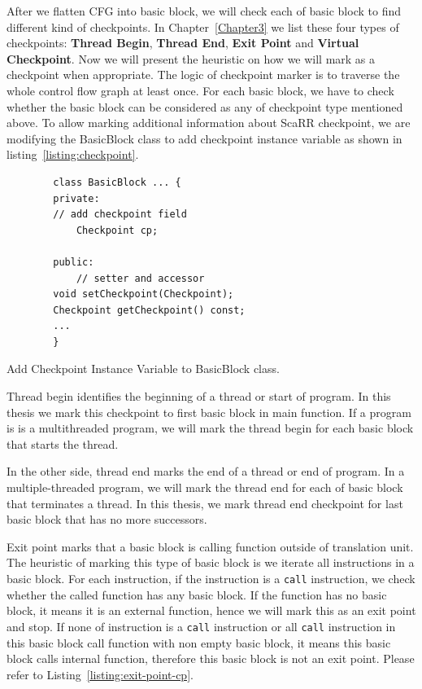 After we flatten CFG into basic block, we will check each of basic block to find
different kind of checkpoints. In Chapter~\ref{Chapter3} we list these four
types of checkpoints: \textbf{Thread Begin}, \textbf{Thread End}, \textbf{Exit
Point} and \textbf{Virtual Checkpoint}. Now we will present the heuristic on how
we will mark as a checkpoint when appropriate.  The logic of checkpoint marker
is to traverse the whole control flow graph at least once. For each basic block,
we have to check whether the basic block can be considered as any of checkpoint
type mentioned above. To allow marking additional information about ScaRR
checkpoint, we are modifying the BasicBlock class to add checkpoint instance
variable as shown in listing~\ref{listing:checkpoint}.

\begin{listing}[htbp]
    \begin{verbatim}
        class BasicBlock ... {
        private:
        // add checkpoint field
            Checkpoint cp;

        public:
            // setter and accessor
        void setCheckpoint(Checkpoint);
        Checkpoint getCheckpoint() const;
        ...
        }
    \end{verbatim}
    \caption{Add Checkpoint Instance Variable to BasicBlock class.}    
    \label{listing:checkpoint}
\end{listing}

Thread begin identifies the beginning of a thread or start of program. In this
thesis we mark this checkpoint to first basic block in main function. If a
program is is a multithreaded program, we will mark the thread begin for each
basic block that starts the thread.

In the other side, thread end marks the end of a thread or end of program. In a
multiple-threaded program, we will mark the thread end for each of basic block
that terminates a thread. In this thesis, we mark thread end checkpoint for last
basic block that has no more successors.

Exit point marks that a basic block is calling function outside of translation
unit. The heuristic of marking this type of basic block is we iterate all
instructions in a basic block. For each instruction, if the instruction is a
\texttt{call} instruction, we check whether the called function has any basic
block. If the function has no basic block, it means it is an external function,
hence we will mark this as an exit point and stop. If none of instruction is a
\texttt{call} instruction or all \texttt{call} instruction in this basic block
call function with non empty basic block, it means this basic block calls
internal function, therefore this basic block is not an exit point. Please refer
to Listing~\ref{listing:exit-point-cp}.

